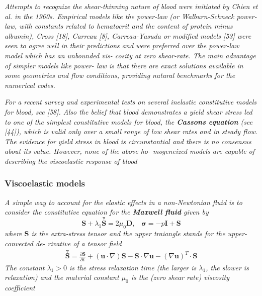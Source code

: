\documentclass[11pt,letterpaper]{article}
\begin{document}
\textit{Attempts to recognize the shear-thinning nature of blood were initiated by Chien et al.  in the 1960s. Empirical models like the power-law (or Walburn-Schneck power-law, with constants related to hematocrit and the content of protein minus albumin), Cross [18], Carreau [8], Carreau-Yasuda or modified models [53] were seen to agree well in their predictions and were preferred over the power-law model which has an unbounded vis- cosity at zero shear-rate. The main advantage of simpler models like power- law is that there are exact solutions available in some geometries and flow conditions, providing natural benchmarks for the numerical codes.}


\textit{For a recent survey and experimental tests on several inelastic constitutive models for blood, see [58]. Also the belief that blood demonstrates a yield shear stress led to one of the simplest constitutive models for blood, the \textbf{Cassons equation} (see [44]), which is valid only over a small range of low shear rates and in steady flow. The evidence for yield stress in blood is circunstantial and there is no consensus about its value. However, none of the above ho- mogeneized models are capable of describing the viscoelastic response of blood}



\subsubsection*{Viscoelastic models}
\textit{A simple way to account for the elastic effects in a non-Newtonian fluid is to consider the constitutive equation for the \textbf{Maxwell fluid} given by}
\begin{equation}
\bm{S}+ \lambda_1 \overset{\triangledown}{\bm{S}} = 2\mu_0\bm{D}, \hspace{10pt} \bm{\sigma} = -p\bm{I} + \bm{S}
\end{equation}
\textit{where $ \bm{S}$ is the extra-stress tensor and the upper traiangle stands for the upper-convected de- rivative of a tensor field}
\begin{align}
\overset{\triangledown}{\bm{S}}  = \frac{\partial \bm{S} }{\partial t} + (\bm{u} \cdot \nabla) \bm{S} - \bm{S} \cdot \nabla \bm{u} - (\nabla \bm{u})^T \cdot \bm{S}
\end{align}
\textit{The constant $\lambda_1 > 0$ is the stress relaxation time (the larger is $\lambda_1$, the
slower is relaxation) and the material constant $\mu_0$ is the (zero shear rate) viscosity coefficient}
\end{document}
